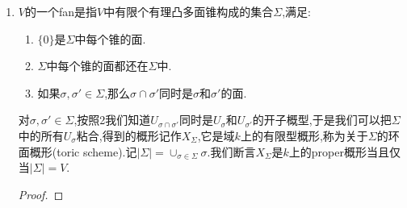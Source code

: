\begin{enumerate}
	证明对任意$\tau\prec\sigma$,我们有典范的开嵌入(open immersion)$U_{\tau}\to U_{\sigma}$;也有典范的闭嵌入$U_{\sigma}(\tau)=\mathrm{Spec}k[M\cap\sigma^{\vee}\cap\tau^{\perp}]\to U_{\sigma}$.
	\begin{enumerate}[(1)]
		\item 先证明面$\tau\prec\sigma$本身也是有理凸多面锥.
		\begin{proof}
			
			我们记$\sigma=\{r_1v_1+\cdots+r_kv_k\mid r_i\ge0,\forall 1\le i\le k\}$.按照面的定义,存在$u\in\sigma^{\vee}$使得$\tau=\sigma\cap u^{\perp}$.不妨重排$\{v_1,\cdots,v_k\}$的次序,使得恰好前$s$项满足$u(v_i)=0$.那么$\tau=\{r_1v_1+\cdots+r_sv_s\mid r_i\ge0,1\le i\le s\}$.这说明$\tau$也是有理凸多面锥.
		\end{proof}
		\item 证明命题.
		\begin{proof}
			
			为证明有典范开嵌入$U_{\tau}\to U_{\sigma}$,只需证明$k[M\cap\tau^{\vee}]$是$k[M\cap\sigma^{\vee}]$关于某个元的局部化.我们可以选取$u\in M\cap\sigma^{\vee}$使得$M\cap\tau^{\vee}=M\cap\sigma^{\vee}+\mathbb{Z}(-u)$.这说明$k[M\cap\tau^{\vee}]$是$k[M\cap\sigma^{\vee}]$关于元$\chi^u$的局部化.
			
			\qquad
			
			为证明有典范闭嵌入$U_{\sigma}(\tau)\to U_{\sigma}$,只需证明$k[M\cap\sigma^{\vee}\cap\tau^{\perp}]$是$k[M\cap\sigma^{\vee}]$的商.重排$\{v_1,\cdots,v_k\}$的次序,使得恰好前$s$项满足$u(v_i)=0$.我们有$M\cap\sigma^{\vee}\cap\tau^{\perp}=\{u\in M\cap\sigma^{\vee}\mid u(v_1),\cdots,u(v_s)=0\}$,于是如果记$S=\{u\in M\cap\sigma^{\vee}\mid u(v_1),\cdots,u(v_s)\text{中至少有一个}>0\}$,记$\{\chi^s,s\in S\}$在$k[M\cap\sigma^{\vee}]$中生成的理想为$I$,那么有$k[M\cap\sigma^{\vee}]/I\cong k[M\cap\sigma^{\vee}\cap\tau^{\perp}]$.
		\end{proof}
	\end{enumerate}
	\item $V$的一个fan是指$V$中有限个有理凸多面锥构成的集合$\Sigma$,满足:
	\begin{enumerate}
		\item $\{0\}$是$\Sigma$中每个锥的面.
		\item $\Sigma$中每个锥的面都还在$\Sigma$中.
		\item 如果$\sigma,\sigma'\in\Sigma$,那么$\sigma\cap\sigma'$同时是$\sigma$和$\sigma'$的面.
	\end{enumerate}
	
	对$\sigma,\sigma'\in\Sigma$,按照2我们知道$U_{\sigma\cap\sigma'}$同时是$U_{\sigma}$和$U_{\sigma'}$的开子概型,于是我们可以把$\Sigma$中的所有$U_{\sigma}$粘合,得到的概形记作$X_{\Sigma}$,它是域$k$上的有限型概形,称为关于$\Sigma$的环面概形(toric scheme).记$|\Sigma|=\cup_{\sigma\in\Sigma}\sigma$.我们断言$X_{\Sigma}$是$k$上的proper概形当且仅当$|\Sigma|=V$.
	\begin{proof}
		

\end{proof}
\end{enumerate}
